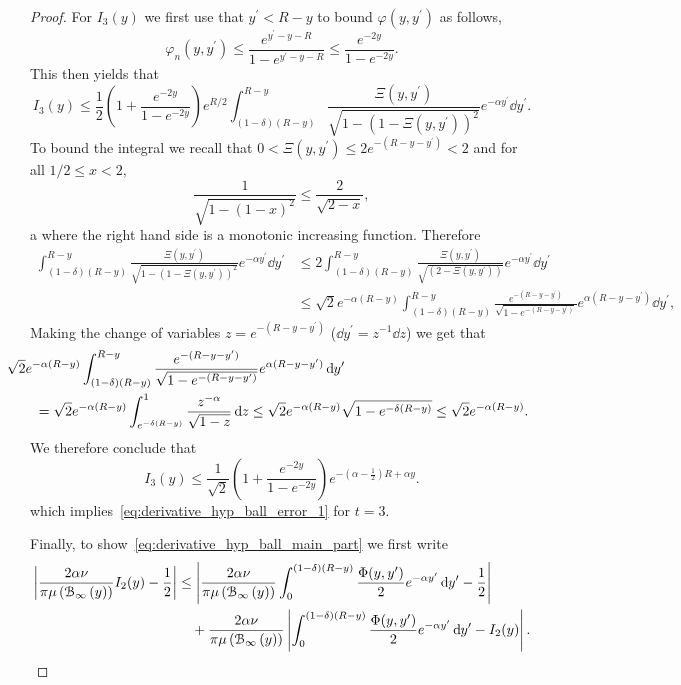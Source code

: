 \begin{appendices}
\begin{proof}
For $I_3(y)$ we first use that $y^\prime < R - y$ to bound $\varphi(y,y^\prime)$ as follows,
\[
	\varphi_n(y,y^\prime) \le \frac{e^{y^\prime - y - R}}{1 - e^{y^\prime - y - R}} \le \frac{e^{-2y}}{1 - e^{-2y}}.
\]
This then yields that
\[
	I_3(y) \le \frac{1}{2}\left(1 + \frac{e^{-2y}}{1 - e^{-2y}}\right)e^{R/2}
	\int_{(1-\delta)(R- y)}^{R - y} \frac{ \Xi(y,y^\prime)}{\sqrt{1 - \left(1 - \Xi(y,y^\prime)\right)^2}}
	e^{-\alpha y^\prime} \dd y^\prime.
\]
To bound the integral we recall that $0 < \Xi(y,y^\prime) \le 2e^{-(R-y-y^\prime)} < 2$ and for all $1/2 \le x < 2$,
\[
	\frac{1}{\sqrt{1- (1-x)^2}} \le \frac{2}{\sqrt{2-x}},
\]a
where the right hand side is a monotonic increasing function.
Therefore
\begin{align*}
	\int_{(1-\delta)(R- y)}^{R - y} \frac{ \Xi(y,y^\prime)}{\sqrt{1 - \left(1 - \Xi(y,y^\prime)\right)^2}}
		e^{-\alpha y^\prime} \dd y^\prime
	&\le 2 \int_{(1-\delta)(R- y)}^{R - y} \frac{\Xi(y,y^\prime)}{\sqrt{(2-\Xi(y,y^\prime))}} e^{-\alpha y^\prime} 
		\dd y^\prime \\
	&\le \sqrt{2} e^{-\alpha(R - y)} \int_{(1-\delta)(R- y)}^{R - y} 
		\frac{e^{-(R - y - y^\prime)}}{\sqrt{1 - e^{-(R - y - y^\prime)}}} e^{\alpha (R - y - y^\prime)} \dd y^\prime,
\end{align*}
Making the change of variables $z = e^{-(R - y - y^\prime)}$ ($\dd y^\prime = z^{-1} \dd z$) we get that
\begin{align*}
	&\hspace{-20pt}\sqrt{2} e^{-\alpha(R - y)} \int_{(1-\delta)(R- y)}^{R - y} 
			\frac{e^{-(R - y - y^\prime)}}{\sqrt{1 - e^{-(R - y - y^\prime)}}} e^{\alpha (R - y - y^\prime)} \dd y^\prime\\
	&= \sqrt{2} e^{-\alpha(R - y)} \int_{e^{-\delta (R - y)}}^{1} \frac{z^{-\alpha}}{\sqrt{1 - z}} \dd z
		\le \sqrt{2} e^{-\alpha(R - y)} \sqrt{1 - e^{-\delta (R - y)}}
		\le \sqrt{2} e^{-\alpha (R -y)}.
\end{align*}
We therefore conclude that
\[
	I_3(y) \le \frac{1}{\sqrt{2}} \left(1 + \frac{e^{-2y}}{1 - e^{-2y}}\right)e^{-(\alpha -\frac{1}{2})R + \alpha y}.
\]
which implies~\eqref{eq:derivative_hyp_ball_error_1} for $t=3$.

Finally, to show~\eqref{eq:derivative_hyp_ball_main_part} we first write
\begin{align*}
	\left|\frac{2\alpha \nu}{\pi \mu\left({\mathcal B}_{\infty}\left(y\right)\right)} I_2(y) - \frac{1}{2}\right|
	&\le \left|\frac{2\alpha \nu}{\pi \mu\left({\mathcal B}_{\infty}\left(y\right)\right)}  \int_0^{(1-\delta)(R- y)} \frac{\Phi(y,y^\prime)}{2} 
		e^{-\alpha y^\prime} \operatorname{\mathrm{d}\hspace{-2pt}} y^\prime - \frac{1}{2}\right| \\
	&\hspace{10pt}+ \frac{2\alpha \nu}{\pi \mu\left({\mathcal B}_{\infty}\left(y\right)\right)}\left|\int_0^{(1-\delta)(R- y)} 
		\frac{\Phi(y,y^\prime)}{2} e^{-\alpha y^\prime} \operatorname{\mathrm{d}\hspace{-2pt}} y^\prime - I_2(y)\right|.
\end{align*}


\end{proof}
\end{appendices}
